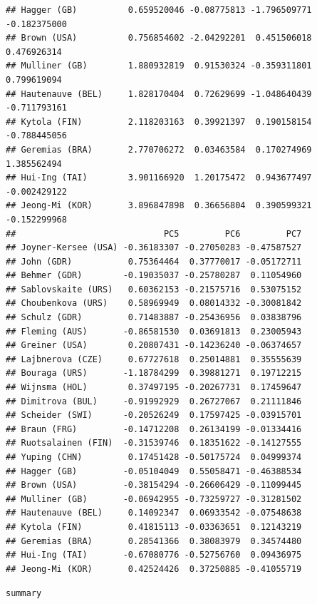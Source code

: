 \documentclass[]{book}
\newenvironment{Shaded}{\begin{snugshade}}{\end{snugshade}}
\newcommand{\DecValTok}[1]{\textcolor[rgb]{0.00,0.00,0.81}{#1}}
\newcommand{\StringTok}[1]{\textcolor[rgb]{0.31,0.60,0.02}{#1}}
\newcommand{\OperatorTok}[1]{\textcolor[rgb]{0.81,0.36,0.00}{\textbf{#1}}}
\newcommand{\NormalTok}[1]{#1}
\begin{document}
\begin{verbatim}
## Hagger (GB)          0.659520046 -0.08775813 -1.796509771 -0.182375000
## Brown (USA)          0.756854602 -2.04292201  0.451506018  0.476926314
## Mulliner (GB)        1.880932819  0.91530324 -0.359311801  0.799619094
## Hautenauve (BEL)     1.828170404  0.72629699 -1.048640439 -0.711793161
## Kytola (FIN)         2.118203163  0.39921397  0.190158154 -0.788445056
## Geremias (BRA)       2.770706272  0.03463584  0.170274969  1.385562494
## Hui-Ing (TAI)        3.901166920  1.20175472  0.943677497 -0.002429122
## Jeong-Mi (KOR)       3.896847898  0.36656804  0.390599321 -0.152299968
##                             PC5         PC6         PC7
## Joyner-Kersee (USA) -0.36183307 -0.27050283 -0.47587527
## John (GDR)           0.75364464  0.37770017 -0.05172711
## Behmer (GDR)        -0.19035037 -0.25780287  0.11054960
## Sablovskaite (URS)   0.60362153 -0.21575716  0.53075152
## Choubenkova (URS)    0.58969949  0.08014332 -0.30081842
## Schulz (GDR)         0.71483887 -0.25436956  0.03838796
## Fleming (AUS)       -0.86581530  0.03691813  0.23005943
## Greiner (USA)        0.20807431 -0.14236240 -0.06374657
## Lajbnerova (CZE)     0.67727618  0.25014881  0.35555639
## Bouraga (URS)       -1.18784299  0.39881271  0.19712215
## Wijnsma (HOL)        0.37497195 -0.20267731  0.17459647
## Dimitrova (BUL)     -0.91992929  0.26727067  0.21111846
## Scheider (SWI)      -0.20526249  0.17597425 -0.03915701
## Braun (FRG)         -0.14712208  0.26134199 -0.01334416
## Ruotsalainen (FIN)  -0.31539746  0.18351622 -0.14127555
## Yuping (CHN)         0.17451428 -0.50175724  0.04999374
## Hagger (GB)         -0.05104049  0.55058471 -0.46388534
## Brown (USA)         -0.38154294 -0.26606429 -0.11099445
## Mulliner (GB)       -0.06942955 -0.73259727 -0.31281502
## Hautenauve (BEL)     0.14092347  0.06933542 -0.07548638
## Kytola (FIN)         0.41815113 -0.03363651  0.12143219
## Geremias (BRA)       0.28541366  0.38083979  0.34574480
## Hui-Ing (TAI)       -0.67080776 -0.52756760  0.09436975
## Jeong-Mi (KOR)       0.42524426  0.37250885 -0.41055719
\end{verbatim}

\begin{Shaded}
\end{Shaded}

\texttt{summary}
\end{document}
